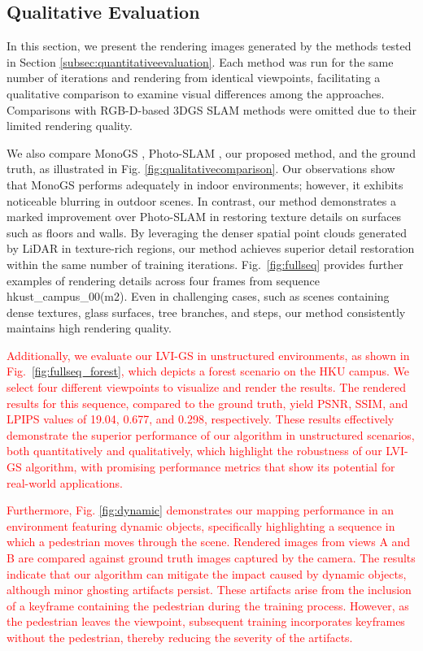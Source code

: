 \documentclass[lettersize,journal]{IEEEtran}
\begin{document}
\subsection{Qualitative Evaluation}
In this section, we present the rendering images generated by the methods tested in Section \ref{subsec:quantitativeevaluation}. Each method was run for the same number of iterations and rendering from identical viewpoints, facilitating a qualitative comparison to examine visual differences among the approaches. Comparisons with RGB-D-based 3DGS SLAM methods were omitted due to their limited rendering quality.

We also compare MonoGS \cite{monogs}, Photo-SLAM \cite{photoslam}, our proposed method, and the ground truth, as illustrated in Fig. \ref{fig:qualitativecomparison}. Our observations show that MonoGS \cite{monogs} performs adequately in indoor environments; however, it exhibits noticeable blurring in outdoor scenes. In contrast, our method demonstrates a marked improvement over Photo-SLAM \cite{photoslam} in restoring texture details on surfaces such as floors and walls. By leveraging the denser spatial point clouds generated by LiDAR in texture-rich regions, our method achieves superior detail restoration within the same number of training iterations. Fig.~\ref{fig:fullseq} provides further examples of rendering details across four frames from sequence hkust_campus_00(m2)\cite{r3live}. Even in challenging cases, such as scenes containing dense textures, glass surfaces, tree branches, and steps, our method consistently maintains high rendering quality.

\textcolor{red}{
Additionally, we evaluate our LVI-GS in unstructured environments, as shown in Fig.~\ref{fig:fullseq_forest}, which depicts a forest scenario on the HKU campus. 
We select four different viewpoints to visualize and render the results. 
The rendered results for this sequence, compared to the ground truth, yield PSNR, SSIM, and LPIPS values of 19.04, 0.677, and 0.298, respectively.
These results effectively demonstrate the superior performance of our algorithm in unstructured scenarios, both quantitatively and qualitatively, which highlight the robustness of our LVI-GS algorithm, with promising performance metrics that show its potential for real-world applications.
}

\textcolor{red}{
Furthermore, Fig. \ref{fig:dynamic} demonstrates our mapping performance in an environment featuring dynamic objects, specifically highlighting a sequence in which a pedestrian moves through the scene. Rendered images from views A and B are compared against ground truth images captured by the camera. The results indicate that our algorithm can mitigate the impact caused by dynamic objects, although minor ghosting artifacts persist. These artifacts arise from the inclusion of a keyframe containing the pedestrian during the training process. However, as the pedestrian leaves the viewpoint, subsequent training incorporates keyframes without the pedestrian, thereby reducing the severity of the artifacts.
}
\end{document}
